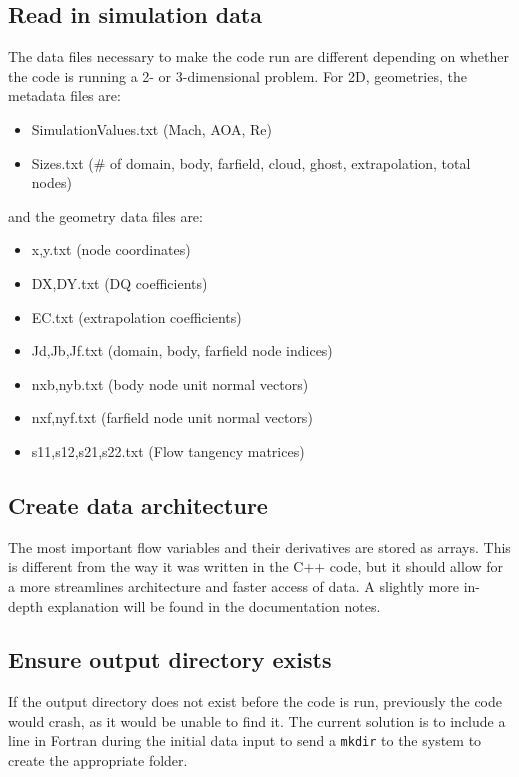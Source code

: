 \documentclass[12pt]{article}
\begin{document}
    \subsection{Read in simulation data}
    The data files necessary to make the code run are different depending on whether the code is running a 2- or 3-dimensional problem. For 2D, geometries, the metadata files are:
    \begin{itemize}
        \item SimulationValues.txt (Mach, AOA, Re)
        \item Sizes.txt (\# of domain, body, farfield, cloud, ghost, extrapolation, total nodes)
    \end{itemize}
    and the geometry data files are:
    \begin{itemize}
        \item x,y.txt (node coordinates)
        \item DX,DY.txt (DQ coefficients)
        \item EC.txt (extrapolation coefficients)
        \item Jd,Jb,Jf.txt (domain, body, farfield node indices)
        \item nxb,nyb.txt (body node unit normal vectors)
        \item nxf,nyf.txt (farfield node unit normal vectors)
        \item s11,s12,s21,s22.txt (Flow tangency matrices)
    \end{itemize}

    \subsection{Create data architecture}
    The most important flow variables and their derivatives are stored as arrays. This is different from the way it was written in the C++ code, but it should allow for a more streamlines architecture and faster access of data. A slightly more in-depth explanation will be found in the documentation notes.

    \subsection{Ensure output directory exists}
    If the output directory does not exist before the code is run, previously the code would crash, as it would be unable to find it. The current solution is to include a line in Fortran during the initial data input to send a \texttt{mkdir} to the system to create the appropriate folder.
\end{document}
